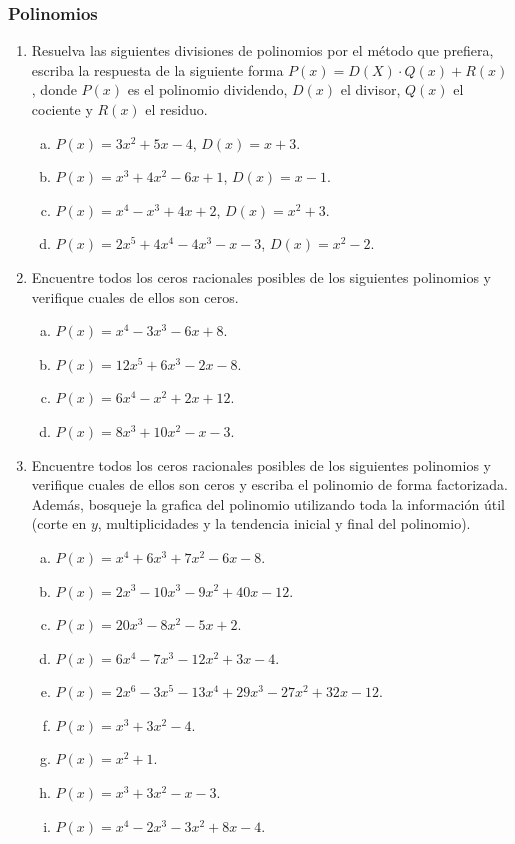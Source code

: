 \subsubsection{Polinomios}
\begin{enumerate}
	\item Resuelva las siguientes divisiones de polinomios por el método que prefiera, escriba la respuesta de la siguiente forma $P(x) = D(X)\cdot Q(x) + R(x)$, donde $P(x)$ es el polinomio dividendo, $D(x)$ el divisor, $Q(x)$ el cociente y $R(x)$ el residuo.
	\begin{enumerate}[a)]
		\item $P(x) = 3x^2 + 5x - 4$, $D(x) = x + 3$.
		\item $P(x) = x^3 + 4x^2 - 6x + 1$, $D(x) = x - 1$.
		\item $P(x) = x^4 - x^3 + 4x + 2$, $D(x) = x^2 + 3$.
		\item $P(x) = 2x^5 + 4x^4 - 4x^3 - x - 3$, $D(x) = x^2 - 2$.
	\end{enumerate}
	\item Encuentre todos los ceros racionales posibles de los siguientes polinomios y verifique cuales de ellos son ceros.
	\begin{enumerate}[a)]
		\item $P(x) = x^4 - 3x^3 - 6x + 8$.
		\item $P(x) = 12x^5 + 6x^3 - 2x - 8$.
		\item $P(x) = 6x^4 - x^2 + 2x + 12$.
		\item $P(x) = 8x^3 + 10x^2 - x - 3$.
	\end{enumerate}
	\item Encuentre todos los ceros racionales posibles de los siguientes polinomios y verifique cuales de ellos son ceros y escriba el polinomio de forma factorizada. Además, bosqueje la grafica del polinomio utilizando toda la información útil (corte en $y$, multiplicidades y la tendencia inicial y final del polinomio).
	\begin{enumerate}[a)]
		\item $P(x) = x^4 + 6x^3 + 7x^2 - 6x - 8$.
		\item $P(x) = 2x^3 - 10x^3 - 9x^2 + 40 x - 12$.
		\item $P(x) = 20x^3 - 8x^2 - 5x + 2$.
		\item $P(x) = 6x^4 - 7x^3 - 12x^2 + 3x - 4$.
		\item $P(x) = 2x^6 - 3x^5 - 13x^4 + 29x^3 - 27x^2 + 32x - 12$.
		\item $P(x) = x^3 + 3x^2 - 4$.
		\item $P(x) = x^2 + 1$.
		\item $P(x) = x^3 + 3x^2 - x - 3$.
		\item $P(x) = x^4 - 2x^3 - 3x^2 + 8x - 4$.
	\end{enumerate}
\end{enumerate}

